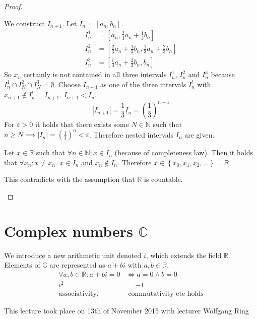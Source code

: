 \documentclass[a4paper,landscape,twocolumn]{article}
\theoremstyle{definition}
\newcommand\set[1]{\left\{#1\right\}}
\newcommand\abs[1]{\left|#1\right|}
\newcommand\meta[3]{\begin{mdframed}[skipbelow=4pt,skipabove=4pt,innermargin=1pt,innerleftmargin=1pt,innerrightmargin=1pt]\begin{center}\small{\textdownarrow{} This #1 took place on #2 with lecturer #3}\end{center}\end{mdframed}}
\begin{document}
\begin{proof}
\begin{description}
      We construct $I_{n+1}$. Let $I_n = [a_n, b_n]$.
      \begin{align*}
        I_n^1 &= \left[a_n, \frac23 a_n + \frac13 b_n\right] \\
        I_n^2 &= \left[\frac23 a_n + \frac13 b_n, \frac13 a_n + \frac23 b_n\right] \\
        I_n^3 &= \left[\frac13 a_n + \frac23 b_n, b_n\right]
      \end{align*}
      So $x_n$ certainly is not contained in all three intervals $I_n^1$, $I_n^2$
      and $I_n^3$ because $I_n^1 \cap I_N^2 \cap I_N^3 = \emptyset$.
      Choose $I_{n+1}$ as one of the three intervals $I_n^l$ with $x_{n+1} \not\in I_n^l = I_{n+1}$.
      $I_{n+1} < I_n$.
      \[ \abs{I_{n+1}} = \frac13 I_{n} = \left(\frac13\right)^{n+1} \]
      For $\varepsilon > 0$ it holds that there exists some $N \in \mathbb N$
      such that $n \geq N \implies \abs{I_n} = \left(\frac13\right)^n < \varepsilon$.
      Therefore nested intervals $I_n$ are given.

      Let $x \in \mathbb R$ such that $\forall n \in \mathbb N: x \in I_n$
      (because of completeness law). Then it holds that $\forall x_n: x \neq x_n$.
      $x \in I_n$ and $x_n \not\in I_n$.
      Therefore $x \in \set{x_0, x_1, x_2, \ldots} = \mathbb R$.

      This contradicts with the assumption that $\mathbb R$ is countable.
  \end{description}
\end{proof}

\section[Complex numbers]{Complex numbers $\mathbb C$}

We introduce a new arithmetic unit denoted $i$, which extends the field $\mathbb R$.
Elements of $\mathbb C$ are represented as $a + bi$ with $a,b \in \mathbb R$.
\begin{align}
  \forall a, b \in \mathbb R: a + bi = 0 &\iff a = 0 \land b = 0 \\
  i^2 &= -1 \\
  \text{associativity,} & \text{ commutativity etc holds}
\end{align}

\meta{lecture}{13th of November 2015}{Wolfgang Ring}
\end{document}
